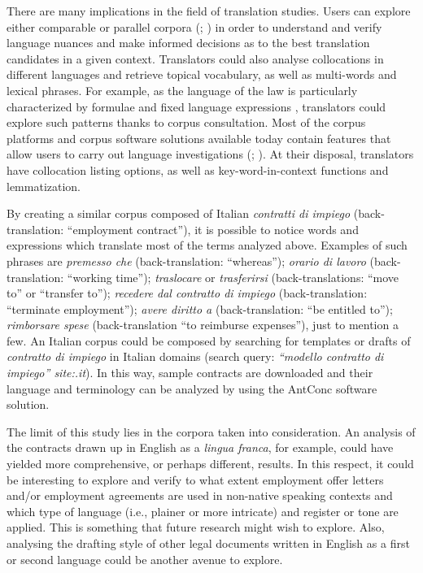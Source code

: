 \documentclass[output=paper]{langscibook}
\begin{document}
There are many implications in the field of translation studies. Users can explore either comparable or parallel corpora (\citealt{FantinuoliZanettin2015}; \citealt{Resi2024}) in order to understand and verify language nuances and make informed decisions as to the best translation candidates in a given context. Translators could also analyse collocations in different languages and retrieve topical vocabulary, as well as multi-words and lexical phrases. For example, as the language of the law is particularly characterized by formulae and fixed language expressions \citep{Giampieri2025}, translators could explore such patterns thanks to corpus consultation. Most of the corpus platforms and corpus software solutions available today contain features that allow users to carry out language investigations (\citealt{chapters/5-Cuchet}; \citealt{Resi2024}). At their disposal, translators have collocation listing options, as well as key-word-in-context functions and lemmatization.

By creating a similar corpus composed of Italian \textit{contratti di impiego} (back-translation: “employment contract”), it is possible to notice words and expressions which translate most of the terms analyzed above. Examples of such phrases are \textit{premesso che} (back-translation: “whereas”); \textit{orario di lavoro} (back-translation: “working time”); \textit{traslocare} or \textit{trasferirsi} (back-translations: “move to” or “transfer to”); \textit{recedere dal contratto di impiego} (back-translation: “terminate employment”); \textit{avere diritto a} (back-translation: “be entitled to”); \textit{rimborsare spese} (back-translation “to reimburse expenses”), just to mention a few. An Italian corpus could be composed by searching for templates or drafts of \textit{contratto di impiego} in Italian domains (search query: \textit{“modello contratto di impiego” site:.it}). In this way, sample contracts are downloaded and their language and terminology can be analyzed by using the AntConc software solution.

The limit of this study lies in the corpora taken into consideration. An analysis of the contracts drawn up in English as a \textit{lingua franca}, for example, could have yielded more comprehensive, or perhaps different, results. In this respect, it could be interesting to explore and verify to what extent employment offer letters and/or employment agreements are used in non-native speaking contexts and which type of language (i.e., plainer or more intricate) and register or tone are applied. This is something that future research might wish to explore. Also, analysing the drafting style of other legal documents written in English as a first or second language could be another avenue to explore.
\end{document}
